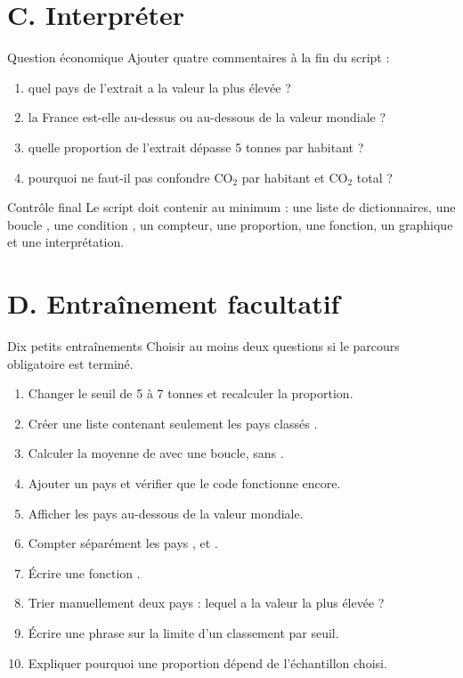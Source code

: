 \documentclass[11pt,a4paper]{article}
\begin{document}
\section*{C. Interpréter}

\begin{mandatoryexercise}{Question économique}
Ajouter quatre commentaires à la fin du script :
\begin{enumerate}
  \item quel pays de l'extrait a la valeur la plus élevée ?
  \item la France est-elle au-dessus ou au-dessous de la valeur mondiale ?
  \item quelle proportion de l'extrait dépasse 5 tonnes par habitant ?
  \item pourquoi ne faut-il pas confondre CO$_2$ par habitant et CO$_2$ total ?
\end{enumerate}
\end{mandatoryexercise}

\begin{mandatoryexercise}{Contrôle final}
Le script doit contenir au minimum : une liste de dictionnaires, une boucle , une condition , un compteur, une proportion, une fonction, un graphique  et une interprétation.
\end{mandatoryexercise}

\section*{D. Entraînement facultatif}

\begin{extensionexercise}{Dix petits entraînements}
Choisir au moins deux questions si le parcours obligatoire est terminé.
\begin{enumerate}
  \item Changer le seuil de 5 à 7 tonnes et recalculer la proportion.
  \item Créer une liste contenant seulement les pays classés .
  \item Calculer la moyenne de  avec une boucle, sans .
  \item Ajouter un pays et vérifier que le code fonctionne encore.
  \item Afficher les pays au-dessous de la valeur mondiale.
  \item Compter séparément les pays ,  et .
  \item Écrire une fonction .
  \item Trier manuellement deux pays : lequel a la valeur la plus élevée ?
  \item Écrire une phrase sur la limite d'un classement par seuil.
  \item Expliquer pourquoi une proportion dépend de l'échantillon choisi.
\end{enumerate}
\end{extensionexercise}
\end{document}
